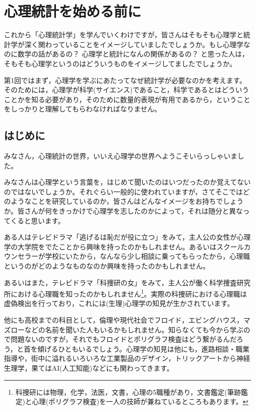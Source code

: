 \documentclass{ltjsbook}
\begin{document}
\chapter{心理統計を始める前に}
\label{b01_introduction}
これから「心理統計学」を学んでいくわけですが，皆さんはそもそも心理学と統計学が深く関わっていることをイメージしていましたでしょうか。もし心理学なのに数学の話があるの？ 心理学と統計になんの関係があるの？ と思った人は，そもそも心理学というのはどういうものをイメージしてましたでしょうか。

第1回ではまず，心理学を学ぶにあたってなぜ統計学が必要なのかを考えます。そのためには，心理学が科学(サイエンス)であること，科学であるとはどういうことかを知る必要があり，そのために数量的表現が有用であるから，ということをしっかりと理解してもらわなければなりません。

\section{はじめに}

みなさん，心理統計の世界，いいえ心理学の世界へようこそいらっしゃいました。

みなさんは心理学という言葉を，はじめて聞いたのはいつだったのか覚えてないのではないでしょうか。それぐらい一般的に使われていますが，さてそこではどのようなことを研究しているのか，皆さんはどんなイメージをお持ちでしょうか。皆さんが何をきっかけで心理学を志したのかによって，それは随分と異なってくると思います。

ある人はテレビドラマ「逃げるは恥だが役に立つ」をみて，主人公の女性が心理学の大学院をでたことから興味を持ったのかもしれません。あるいはスクールカウンセラーが学校にいたから，なんなら少し相談に乗ってもらったから，心理職というのがどのようなものなのか興味を持ったのかもしれません。

あるいはまた，テレビドラマ「科捜研の女」をみて，主人公が働く科学捜査研究所における心理職を知ったのかもしれません\footnote{科捜研には物理，化学，法医，文書，心理の5職種があり，文書鑑定(筆跡鑑定)と心理(ポリグラフ検査)を一人の技師が兼ねているところもあります。}。実際の科捜研における心理職は虚偽検出を行っており，これには(生理)心理学の知見が生かされています。

他にも高校までの科目として，倫理や現代社会でフロイド，エビングハウス，マズローなどの名前を聞いた人もいるかもしれません。知らなくても今から学ぶので問題ないのですが，それでもフロイドとポリグラフ検査はどう繋がるんだろう，と首を傾げるひともいるでしょう。心理学の知見は他にも，進路相談・職業指導や，街中に溢れるいろいろな工業製品のデザイン，トリックアートから神経生理学，果てはAI(人工知能)などにも関わってきます。
\end{document}
